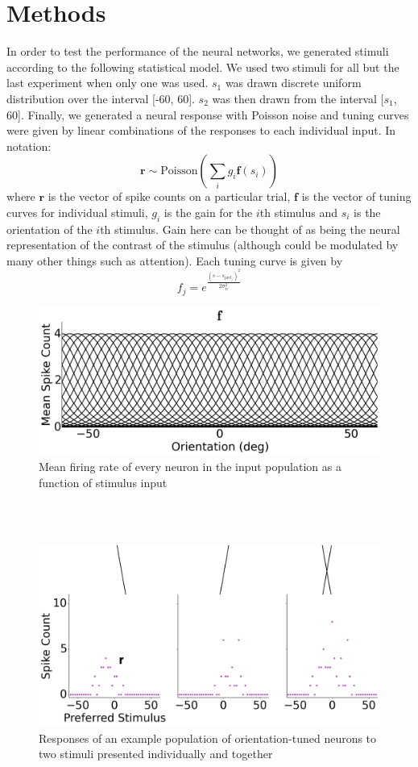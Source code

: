 \documentclass{article} %
\begin{document}
\section{Methods}
In order to test the performance of the neural networks, we generated stimuli according to the following statistical model. We used two stimuli for all but the last experiment when only one was used. $s_1$ was drawn discrete uniform distribution over the interval [-60, 60]. $s_2$ was then drawn from the interval [$s_1$, 60]. Finally, we generated a neural response with Poisson noise and tuning curves were given by linear combinations of the responses to each individual input. In notation:
\begin{equation}
	\mathbf{r} \sim \text{Poisson}(\sum_i g_i \mathbf{f}(s_i))
\end{equation}
where $\mathbf{r}$ is the vector of spike counts on a particular trial, $\mathbf{f}$ is the vector of tuning curves for individual stimuli, $g_i$ is the gain for the $i$th stimulus and $s_i$ is the orientation of the $i$th stimulus. Gain here can be thought of as being the neural representation of the contrast of the stimulus (although could be modulated by many other things such as attention).
Each tuning curve is given by
\begin{equation}
	f_j = e^\frac{(s - s_{\text{pref}_j})^2}{2 \sigma_{\text{tc}}^2}
\end{equation}
\begin{figure}[h]
\centering
\includegraphics[width = .6\textwidth]{Tuning_Curves.png}
\caption{Mean firing rate of every neuron in the input population as a function of stimulus input}
\end{figure}
\\
\\
\begin{figure}[h]
\centering
\includegraphics[width = \textwidth]{Neural_Response.png}
\caption{Responses of an example population of orientation-tuned neurons to two stimuli presented individually and together}
\label{Neural_Response}
\end{figure}
\end{document}
